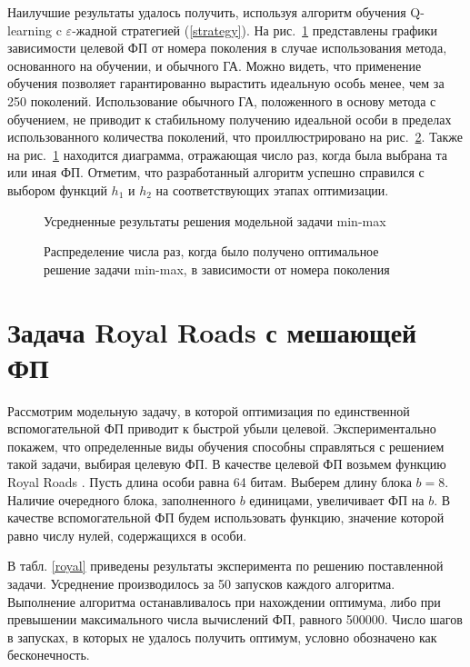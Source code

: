 	Наилучшие результаты удалось получить, используя алгоритм обучения Q-learning c $\varepsilon$-жадной стратегией (\ref{strategy}). На рис.~\ref{pict:mm-dn-bounds} представлены графики зависимости 
    целевой ФП от номера поколения в случае использования метода, основанного на обучении, и обычного ГА. Можно видеть, что применение обучения позволяет гарантированно 
    вырастить идеальную особь менее, чем за 250 поколений. Использование обычного ГА, положенного в основу метода с обучением, не приводит к стабильному получению 
    идеальной особи в пределах использованного количества поколений, что проиллюстрировано на рис.~\ref{histogram}. Также на рис.~\ref{pict:mm-dn-bounds} находится диаграмма, отражающая число раз, когда была выбрана та или иная ФП. Отметим, что разработанный алгоритм успешно справился с выбором функций $h_1$ и $h_2$ на соответствующих этапах оптимизации.
	
	\begin{figure}[h!]
		\caption{Усредненные результаты решения модельной задачи min-max}
		\label{pict:mm-dn-bounds}
	\end{figure}
	
	\begin{figure}[h!]
		\caption{Распределение числа раз, когда было получено оптимальное решение задачи min-max, в зависимости от номера поколения}
		\label{histogram}
	\end{figure}
	
\section{Задача Royal Roads с мешающей ФП}

Рассмотрим модельную задачу, в которой оптимизация по единственной вспомогательной ФП приводит к быстрой убыли целевой. Экспериментально покажем, что определенные виды обучения способны справляться с решением такой задачи, выбирая целевую ФП. В качестве целевой ФП возьмем функцию Royal Roads \cite{mitchell-ga}. Пусть длина особи равна 64 битам. Выберем длину блока $b = 8$. Наличие очередного блока, заполненного $b$ единицами, увеличивает ФП на $b$. В качестве вспомогательной ФП будем использовать функцию, значение которой равно числу нулей, содержащихся в особи. 

В табл. \ref{royal} приведены результаты эксперимента по решению поставленной задачи. Усреднение производилось за 50 запусков каждого алгоритма. Выполнение алгоритма останавливалось при нахождении оптимума, либо при превышении максимального числа вычислений ФП, равного 500000. Число шагов в запусках, в которых не удалось получить оптимум, условно обозначено как бесконечность.

